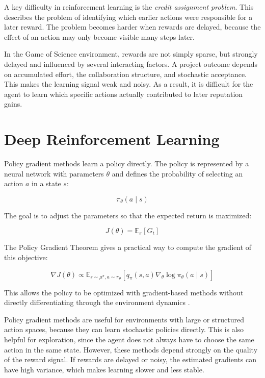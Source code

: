 \documentclass[english,bachelor]{hsluthesis}
\begin{document}
A key difficulty in reinforcement learning is the \emph{credit assignment problem}. This describes the problem of identifying which earlier actions were responsible for a later reward. The problem becomes harder when rewards are delayed, because the effect of an action may only become visible many steps later.

In the Game of Science environment, rewards are not simply sparse, but strongly delayed and influenced by several interacting factors. A project outcome depends on accumulated effort, the collaboration structure, and stochastic acceptance. This makes the learning signal weak and noisy. As a result, it is difficult for the agent to learn which specific actions actually contributed to later reputation gains.

\section{Deep Reinforcement Learning}

Policy gradient methods learn a policy directly. The policy is represented by a neural network with parameters $\theta$ and defines the probability of selecting an action $a$ in a state $s$:

\[
\pi_\theta(a \mid s)
\]

The goal is to adjust the parameters so that the expected return is maximized:

\begin{equation}
J(\theta) = \mathbb{E}_\pi[G_t]
\end{equation}

The Policy Gradient Theorem gives a practical way to compute the gradient of this objective:

\begin{equation}
\nabla J(\theta)
\propto
\mathbb{E}_{s \sim \mu^\pi, a \sim \pi_\theta}
\left[
q_\pi(s,a)\nabla_\theta \log \pi_\theta(a \mid s)
\right]
\end{equation}

This allows the policy to be optimized with gradient-based methods without directly differentiating through the environment dynamics \cite{sutton2018reinforcement}.

Policy gradient methods are useful for environments with large or structured action spaces, because they can learn stochastic policies directly. This is also helpful for exploration, since the agent does not always have to choose the same action in the same state. However, these methods depend strongly on the quality of the reward signal. If rewards are delayed or noisy, the estimated gradients can have high variance, which makes learning slower and less stable.
\end{document}
